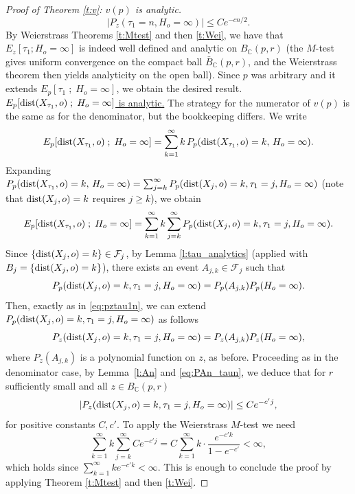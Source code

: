 \documentclass[a4paper]{amsart}
\newcommand{\D}[1]{{\rm dist}(X_{#1},o)}
\begin{document}
\begin{proof}[Proof of Theorem \ref{t:v}: $v(p)$ is analytic]
\begin{equation}
    \left|P_z(\tau_1 = n, H_o = \infty)\right| \leq C e^{-cn/2}.
\end{equation}
By Weierstrass Theorems \ref{t:Mtest} and then \ref{t:Wei}, we have that $E_z[\tau_1 ; H_o = \infty]$ is indeed well defined and analytic on $B_{\mathbb{C}}(p,r)$ (the $M$-test gives uniform convergence on the compact ball $\bar{B}_{\mathbb{C}}(p,r)$, and the Weierstrass theorem then yields analyticity on the open ball). Since $p$ was arbitrary and it extends $E_p[{\tau_1} \; ; \; H_o = \infty ]$, we obtain the desired result. \\

\noindent \underline{$ E_p[\D{\tau_1} \; ; \; H_o = \infty ]$ is analytic.} The strategy for the numerator of $v(p)$ is the same as for the denominator, but the bookkeeping differs. We write
$$
E_p[\D{\tau_1} \; ; \; H_o = \infty ] = \sum_{k=1}^\infty k\, P_p(\D{\tau_1} = k,\, H_o = \infty).
$$
Expanding $P_p(\D{\tau_1} = k,\, H_o = \infty) = \sum_{j=k}^\infty P_p(\D{j} = k, \tau_1 = j, H_o = \infty)$ (note that $\D{j} = k$ requires $j \ge k$), we obtain
$$
E_p[\D{\tau_1} \; ; \; H_o = \infty ] = \sum_{k=1}^\infty k\sum_{j=k}^\infty P_p(\D{j} = k, \tau_1 = j, H_o = \infty).
$$
Since $\{\D{j} = k\} \in \mathcal{F}_j$, by Lemma \ref{l:tau_analytics} (applied with $B_j = \{\D{j} = k\}$), there exists an event $A_{j,k} \in \mathcal{F}_j$ such that 
\begin{equation*}
P_p(\D{j} = k, \tau_1 = j, H_o = \infty) = P_p(A_{j,k})P_p(H_o = \infty).    
\end{equation*}
Then, exactly as in \eqref{eq:pztau1n}, we can extend $P_p(\D{j} = k, \tau_1 = j, H_o = \infty) $ as follows
\begin{equation}\label{eq:pzdjk}
    P_z(\D{j} = k, \tau_1 = j, H_o = \infty) = P_z(A_{j,k})P_z(H_o = \infty),
\end{equation}
where $P_z(A_{j,k})$ is a polynomial function on $z$, as before. Proceeding as in the denominator case, by Lemma~\ref{l:An} and \eqref{eq:PAn_taun}, we deduce that for $r$ sufficiently small and all $z \in B_{\mathbb{C}}(p,r)$
\begin{equation}
    |P_z(\D{j} = k, \tau_1 = j, H_o = \infty)| \le C e^{-c'j},
\end{equation}
for positive constants $C, c'$. To apply the Weierstrass $M$-test we need
$$
\sum_{k=1}^\infty k \sum_{j=k}^\infty C e^{-c'j} = C\sum_{k=1}^\infty k \cdot \frac{e^{-c'k}}{1 - e^{-c'}} < \infty,
$$
which holds since $\sum_{k=1}^\infty k e^{-c'k} < \infty$. This is enough to conclude the proof by applying Theorem \ref{t:Mtest} and then \ref{t:Wei}.



\end{proof}
\end{document}
